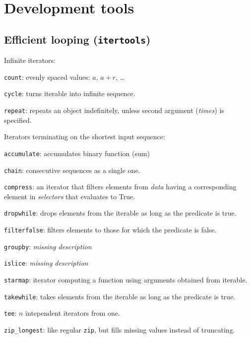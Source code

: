 \section{Development tools}
\subsection{Efficient looping (\texttt{itertools})}
Infinite iterators:
\begin{compactenum}
\item \texttt{count}: evenly spaced values: $a$, $a+ r$, \ldots
\item \texttt{cycle}: turns iterable into infinite sequence.
\item \texttt{repeat}: repeats an object indefinitely, unless second argument (\emph{times}) is specified.
\end{compactenum}

Iterators terminating on the shortest input sequence:
\begin{compactenum}
\item \texttt{accumulate}: accumulates binary function (sum)
\item \texttt{chain}: consecutive sequences as a single one.
\item \texttt{compress}: an iterator that filters elements from \emph{data} having a corresponding element in \emph{selectors} that evaluates to True.
\item \texttt{dropwhile}: drops elements from the iterable as long as the predicate is true.
\item \texttt{filterfalse}: filters elements to those for which the predicate is false.
\item \texttt{groupby}: \emph{\color{red} missing description}
\item \texttt{islice}: \emph{\color{red} missing description}
\item \texttt{starmap}: iterator computing a function using arguments obtained from iterable.
\item \texttt{takewhile}: takes elements from the iterable as long as the predicate is true.
\item \texttt{tee}: $n$ intependent iterators from one.
\item \texttt{zip_longest}: like regular \texttt{zip}, but fills missing values instead of truncating.
\end{compactenum}

